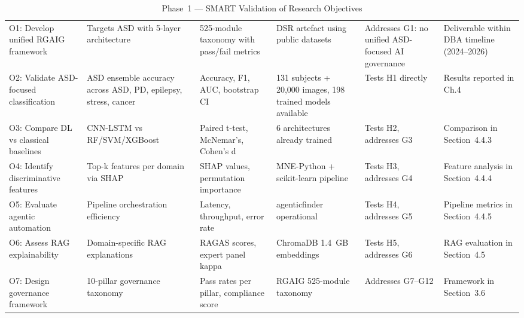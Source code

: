 \begingroup\singlespacing\tablefontsize\tablestripes
\begin{xltabular}{\textwidth}{@{} p{0.22\textwidth} X X X X X @{}}
\caption{Phase~1 --- SMART Validation of Research Objectives}
\label{tab:phase1_smart}\\
\toprule
{} &  &  &  &  &  \\
\midrule
\endfirsthead
\endhead
\bottomrule
\endlastfoot
O1: Develop unified RGAIG framework & Targets ASD with 5-layer architecture & 525-module taxonomy with pass/fail metrics & DSR artefact using public datasets & Addresses G1: no unified ASD-focused AI governance & Deliverable within DBA timeline (2024--2026) \\
\addlinespace
O2: Validate ASD-focused classification & ASD ensemble accuracy across ASD, PD, epilepsy, stress, cancer & Accuracy, F1, AUC, bootstrap CI & 131 subjects + 20{,}000 images, 198 trained models available & Tests H1 directly & Results reported in Ch.4 \\
\addlinespace
O3: Compare DL vs classical baselines & CNN-LSTM vs RF/\allowbreak{}SVM/\allowbreak{}XGBoost & Paired t-test, McNemar's, Cohen's d & 6 architectures already trained & Tests H2, addresses G3 & Comparison in Section~4.4.3 \\
\addlinespace
O4: Identify discriminative features & Top-k features per domain via SHAP & SHAP values, permutation importance & MNE-Python + scikit-learn pipeline & Tests H3, addresses G4 & Feature analysis in Section~4.4.4 \\
\addlinespace
O5: Evaluate agentic automation & Pipeline orchestration efficiency & Latency, throughput, error rate & agenticfinder operational & Tests H4, addresses G5 & Pipeline metrics in Section~4.4.5 \\
\addlinespace
O6: Assess RAG explainability & Domain-specific RAG explanations & RAGAS scores, expert panel kappa & ChromaDB 1.4~GB embeddings & Tests H5, addresses G6 & RAG evaluation in Section~4.5 \\
\addlinespace
O7: Design governance framework & 10-pillar governance taxonomy & Pass rates per pillar, compliance score & RGAIG 525-module taxonomy & Addresses G7--G12 & Framework in Section~3.6 \\
\end{xltabular}
\endgroup

\vspace{1.5em}

